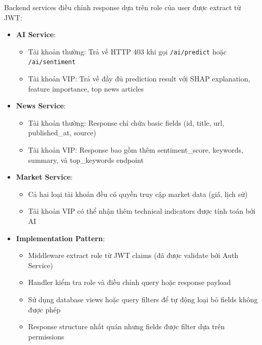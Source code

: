 Backend services điều chỉnh response dựa trên role của user được extract từ JWT:
\begin{itemize}
    \item \textbf{AI Service}:
    \begin{itemize}
        \item Tài khoản thường: Trả về HTTP 403 khi gọi \texttt{/ai/predict} hoặc \texttt{/ai/sentiment}
        \item Tài khoản VIP: Trả về đầy đủ prediction result với SHAP explanation, feature importance, top news articles
    \end{itemize}
    \item \textbf{News Service}:
    \begin{itemize}
        \item Tài khoản thường: Response chỉ chứa basic fields (id, title, url, published\_at, source)
        \item Tài khoản VIP: Response bao gồm thêm sentiment\_score, keywords, summary, và top\_keywords endpoint
    \end{itemize}
    \item \textbf{Market Service}:
    \begin{itemize}
        \item Cả hai loại tài khoản đều có quyền truy cập market data (giá, lịch sử)
        \item Tài khoản VIP có thể nhận thêm technical indicators được tính toán bởi AI
    \end{itemize}
    \item \textbf{Implementation Pattern}: 
    \begin{itemize}
        \item Middleware extract role từ JWT claims (đã được validate bởi Auth Service)
        \item Handler kiểm tra role và điều chỉnh query hoặc response payload
        \item Sử dụng database views hoặc query filters để tự động loại bỏ fields không được phép
        \item Response structure nhất quán nhưng fields được filter dựa trên permissions
    \end{itemize}
\end{itemize}